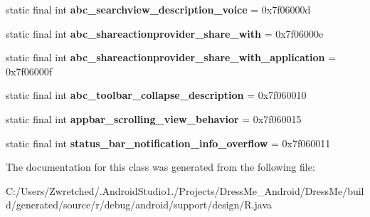 \begin{DoxyCompactItemize}
\item 
\hypertarget{classandroid_1_1support_1_1design_1_1_r_1_1string_a04a007dba1181292400d15625e31353a}{}static final int {\bfseries abc\+\_\+searchview\+\_\+description\+\_\+voice} = 0x7f06000d\label{classandroid_1_1support_1_1design_1_1_r_1_1string_a04a007dba1181292400d15625e31353a}

\item 
\hypertarget{classandroid_1_1support_1_1design_1_1_r_1_1string_a77ff2da70667bbe5ae57ebdbdc2738ea}{}static final int {\bfseries abc\+\_\+shareactionprovider\+\_\+share\+\_\+with} = 0x7f06000e\label{classandroid_1_1support_1_1design_1_1_r_1_1string_a77ff2da70667bbe5ae57ebdbdc2738ea}

\item 
\hypertarget{classandroid_1_1support_1_1design_1_1_r_1_1string_abe49db143c1d58a411f52de9775ac1f8}{}static final int {\bfseries abc\+\_\+shareactionprovider\+\_\+share\+\_\+with\+\_\+application} = 0x7f06000f\label{classandroid_1_1support_1_1design_1_1_r_1_1string_abe49db143c1d58a411f52de9775ac1f8}

\item 
\hypertarget{classandroid_1_1support_1_1design_1_1_r_1_1string_a1eb7e00e0658289be2b77468cd353b75}{}static final int {\bfseries abc\+\_\+toolbar\+\_\+collapse\+\_\+description} = 0x7f060010\label{classandroid_1_1support_1_1design_1_1_r_1_1string_a1eb7e00e0658289be2b77468cd353b75}

\item 
\hypertarget{classandroid_1_1support_1_1design_1_1_r_1_1string_a87a9e93b543f76960b86c5e59fd5a9d0}{}static final int {\bfseries appbar\+\_\+scrolling\+\_\+view\+\_\+behavior} = 0x7f060015\label{classandroid_1_1support_1_1design_1_1_r_1_1string_a87a9e93b543f76960b86c5e59fd5a9d0}

\item 
\hypertarget{classandroid_1_1support_1_1design_1_1_r_1_1string_ae7e600aba7d20d01b5e3b4ccc3847bc9}{}static final int {\bfseries status\+\_\+bar\+\_\+notification\+\_\+info\+\_\+overflow} = 0x7f060011\label{classandroid_1_1support_1_1design_1_1_r_1_1string_ae7e600aba7d20d01b5e3b4ccc3847bc9}

\end{DoxyCompactItemize}


The documentation for this class was generated from the following file\+:\begin{DoxyCompactItemize}
\item 
C\+:/\+Users/\+Zwretched/.\+Android\+Studio1./\+Projects/\+Dress\+Me\+\_\+\+Android/\+Dress\+Me/build/generated/source/r/debug/android/support/design/R.\+java\end{DoxyCompactItemize}
